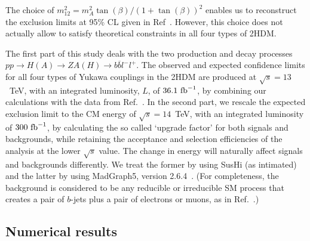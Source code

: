 The choice of \(m^2_{12} = m_A^2 \tan(\beta) / (1 + \tan(\beta))^2\) enables us to reconstruct the exclusion limits at 95\%  CL given in Ref~\cite{Aaboud2018AZHbbll}.
However, this choice does not actually allow to satisfy theoretical constraints in all four types of 2HDM.

The first part of this study deals with the two production and decay processes \(pp \rightarrow H(A) \rightarrow ZA(H)\rightarrow b\overline{b}l^{-}l^{+}\).
The observed and expected confidence limits for all four types of Yukawa couplings in the 2HDM are produced at \(\sqrt{s}=13\)~TeV, with an integrated luminosity, $L$, of \(36.1~{\rm fb}^{-1}\),
by combining our calculations with the data from Ref.~\cite{Aaboud2018AZHbbll}. 
In the second part, we rescale the expected exclusion limit to the CM energy of \(\sqrt{s}=14\)~TeV,
with an integrated luminosity of \(300~{\rm fb}^{-1}\), by calculating the so called `upgrade factor' for both signals and backgrounds, while retaining the acceptance and selection efficiencies of the analysis at the lower $\sqrt s$ value. The change in energy will naturally affect signals and backgrounds differently. We treat the former by using SusHi (as intimated) and the latter by  using {MadGraph5, version 2.6.4}~\cite{alwall_madgraph2011}. (For completeness, the
 background is considered to be any reducible or irreducible SM process that creates a pair of $b$-jets plus a pair of electrons or muons, as in Ref.~\cite{Aaboud2018AZHbbll}.)

\subsection{Numerical results}


